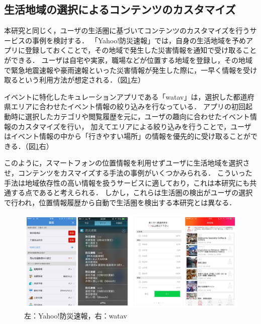 \documentclass[a4paper]{jsarticle}
\begin{document}
\subsection{生活地域の選択によるコンテンツのカスタマイズ}
本研究と同じく，ユーザの生活圏に基づいてコンテンツのカスタマイズを行うサービスの事例を検討する．
「Yahoo!防災速報\cite{yahoo}」では，自身の生活地域を予めアプリに登録しておくことで，その地域で発生した災害情報を通知で受け取ることができる．
ユーザは自宅や実家，職場などが位置する地域を登録し，その地域で緊急地震速報や豪雨速報といった災害情報が発生した際に，一早く情報を受け取るという利用方法が想定される．（図\ref{fig:yahoo-watav}左）


イベントに特化したキュレーションアプリである「watav\cite{watav}」は，選択した都道府県エリアに合わせたイベント情報の絞り込みを行なっている．
アプリの初回起動時に選択したカテゴリや閲覧履歴を元に，ユーザの趣向に合わせたイベント情報のカスタマイズを行い，
加えてエリアによる絞り込みを行うことで，ユーザはイベント情報の中から「行きやすい場所」の情報を優先的に受け取ることができる．（図\ref{fig:yahoo-watav}右）


このように，スマートフォンの位置情報を利用せずユーザに生活地域を選択させ，コンテンツをカスマイズする手法の事例がいくつかみられる．
こういった手法は地域依存性の高い情報を扱うサービスに適しており，これは本研究にも共通する点であると考えられる．
しかし，これらは生活圏の検出がユーザの選択で行われ，位置情報履歴から自動で生活圏を検出する本研究とは異なる．

\fifigure
\begin{figure}[H]
  \begin{center}
    \includegraphics[width=1.0\hsize]{./images/yahoo_watav.jpg}
    \caption{左：Yahoo!防災速報，右：watav}
    \label{fig:yahoo-watav}
  \end{center}
\end{figure}
\fi
\end{document}
